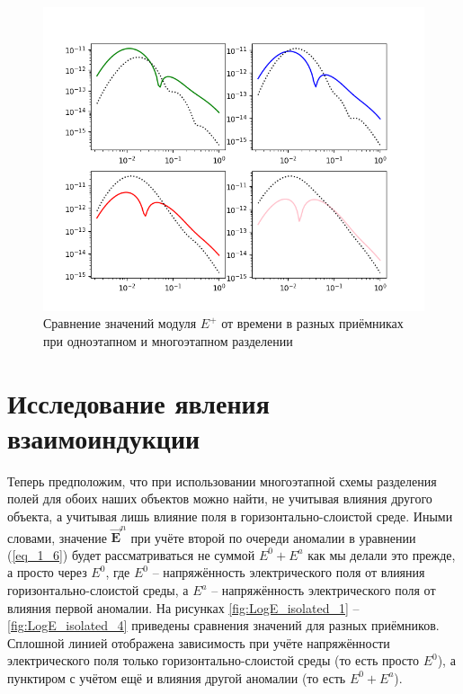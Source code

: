 \begin{figure}
	\centering
	\vspace*{0.7cm}
	\includegraphics[width=1.0\linewidth]{images/Log_E_compare_both_with_msrp.png}
	\caption{Сравнение значений модуля $E^+$ от времени в разных приёмниках при одноэтапном и многоэтапном разделении}
	\label{fig:LogE_compare_both_and_msrp}
\end{figure}  
 

\section{Исследование явления взаимоиндукции}

Теперь предположим, что при использовании многоэтапной схемы разделения полей для обоих наших объектов можно найти, не учитывая влияния другого объекта, а учитывая лишь влияние поля в горизонтально-слоистой среде. Иными словами, значение $\overrightarrow{\textbf{E}}^n$ при учёте второй по очереди аномалии в уравнении (\ref{eq_1_6}) будет рассматриваться не суммой $E^0 + E^a$ как мы делали это прежде, а просто через $E^0$, где $E^0$ -- напряжённость электрического поля от влияния горизонтально-слоистой среды, а $E^a$ -- напряжённость электрического поля от влияния первой аномалии. На рисунках \ref{fig:LogE_isolated_1} -- \ref{fig:LogE_isolated_4} приведены сравнения значений для разных приёмников. Сплошной линией отображена зависимость при учёте напряжённости электрического поля только горизонтально-слоистой среды (то есть просто $E^0$), а пунктиром с учётом ещё и влияния другой аномалии (то есть $E^0 + E^a$).


